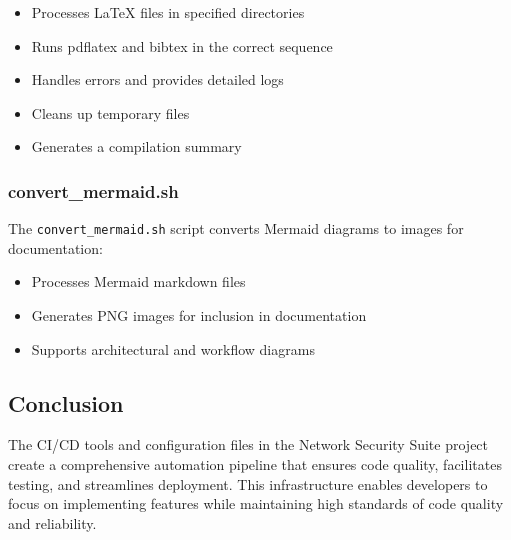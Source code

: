 \begin{itemize}
    \item Processes LaTeX files in specified directories
    \item Runs pdflatex and bibtex in the correct sequence
    \item Handles errors and provides detailed logs
    \item Cleans up temporary files
    \item Generates a compilation summary
\end{itemize}

\subsubsection{convert\_mermaid.sh}
The \texttt{convert\_mermaid.sh} script converts Mermaid diagrams to images for documentation:

\begin{itemize}
    \item Processes Mermaid markdown files
    \item Generates PNG images for inclusion in documentation
    \item Supports architectural and workflow diagrams
\end{itemize}

\subsection{Conclusion}
The CI/CD tools and configuration files in the Network Security Suite project create a comprehensive automation pipeline that ensures code quality, facilitates testing, and streamlines deployment. This infrastructure enables developers to focus on implementing features while maintaining high standards of code quality and reliability.